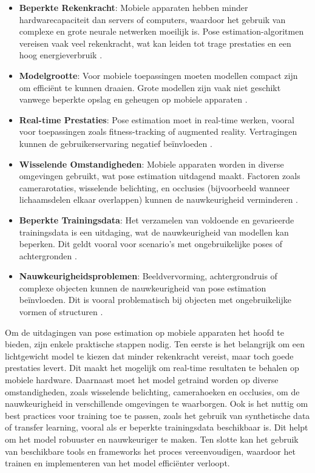 \begin{itemize}
    \item \textbf{Beperkte Rekenkracht}: 
    Mobiele apparaten hebben minder hardwarecapaciteit dan servers of computers, waardoor het gebruik van complexe en grote neurale netwerken moeilijk is. Pose estimation-algoritmen vereisen vaak veel rekenkracht, wat kan leiden tot trage prestaties en een hoog energieverbruik \autocite{LiuEtAl2022}.

    \item \textbf{Modelgrootte}: 
    Voor mobiele toepassingen moeten modellen compact zijn om efficiënt te kunnen draaien. Grote modellen zijn vaak niet geschikt vanwege beperkte opslag en geheugen op mobiele apparaten \autocite{HouEtAl2020}.

    \item \textbf{Real-time Prestaties}: 
    Pose estimation moet in real-time werken, vooral voor toepassingen zoals fitness-tracking of augmented reality. Vertragingen kunnen de gebruikerservaring negatief beïnvloeden \autocite{HouEtAl2020}.

    \item \textbf{Wisselende Omstandigheden}: 
    Mobiele apparaten worden in diverse omgevingen gebruikt, wat pose estimation uitdagend maakt. Factoren zoals camerarotaties, wisselende belichting, en occlusies (bijvoorbeeld wanneer lichaamsdelen elkaar overlappen) kunnen de nauwkeurigheid verminderen \autocite{SulongEtAl2023}.

    \item \textbf{Beperkte Trainingsdata}: 
    Het verzamelen van voldoende en gevarieerde trainingsdata is een uitdaging, wat de nauwkeurigheid van modellen kan beperken. Dit geldt vooral voor scenario’s met ongebruikelijke poses of achtergronden \autocite{PauloEtAl2024}.

    \item \textbf{Nauwkeurigheidsproblemen}: 
    Beeldvervorming, achtergrondruis of complexe objecten kunnen de nauwkeurigheid van pose estimation beïnvloeden. Dit is vooral problematisch bij objecten met ongebruikelijke vormen of structuren \autocite{SulongEtAl2023}.
\end{itemize}

Om de uitdagingen van pose estimation op mobiele apparaten het hoofd te bieden, zijn enkele praktische stappen nodig. Ten eerste is het belangrijk om een lichtgewicht model te kiezen dat minder rekenkracht vereist, maar toch goede prestaties levert. Dit maakt het mogelijk om real-time resultaten te behalen op mobiele hardware. Daarnaast moet het model getraind worden op diverse omstandigheden, zoals wisselende belichting, camerahoeken en occlusies, om de nauwkeurigheid in verschillende omgevingen te waarborgen.
\medskip
Ook is het nuttig om best practices voor training toe te passen, zoals het gebruik van synthetische data of transfer learning, vooral als er beperkte trainingsdata beschikbaar is. Dit helpt om het model robuuster en nauwkeuriger te maken. Ten slotte kan het gebruik van beschikbare tools en frameworks het proces vereenvoudigen, waardoor het trainen en implementeren van het model efficiënter verloopt.


